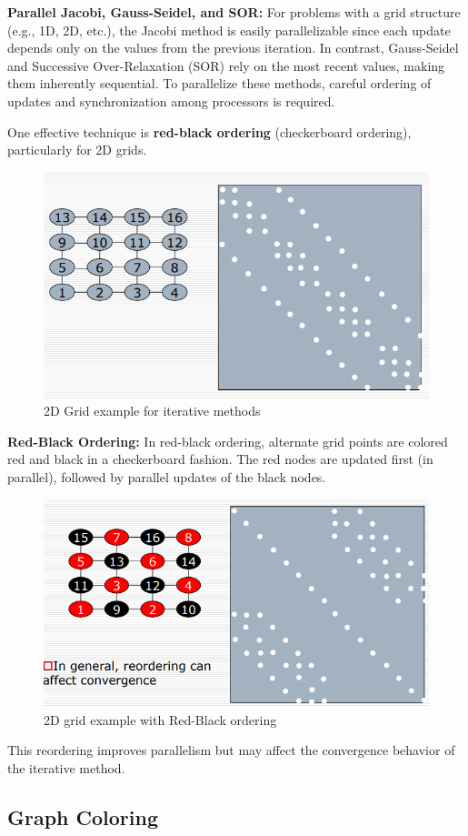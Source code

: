 \documentclass[12pt]{book}
\begin{document}
\textbf{Parallel Jacobi, Gauss-Seidel, and SOR:}  
For problems with a grid structure (e.g., 1D, 2D, etc.), the Jacobi method is easily parallelizable since each update depends only on the values from the previous iteration.  
In contrast, Gauss-Seidel and Successive Over-Relaxation (SOR) rely on the most recent values, making them inherently sequential. To parallelize these methods, careful ordering of updates and synchronization among processors is required.

One effective technique is \textbf{red-black ordering} (checkerboard ordering), particularly for 2D grids.  

\begin{figure}[ht]
    \centering
    \includegraphics[width=0.5\linewidth]{images/2dgridexam.png}
    \caption{2D Grid example for iterative methods}
    \label{fig:2dgridexamp}
\end{figure}

\textbf{Red-Black Ordering:}  
In red-black ordering, alternate grid points are colored red and black in a checkerboard fashion. The red nodes are updated first (in parallel), followed by parallel updates of the black nodes.  

\begin{figure}[ht]
    \centering
    \includegraphics[width=0.5\linewidth]{images/2DRBorder.png}
    \caption{2D grid example with Red-Black ordering}
    \label{fig:2DRBord}
\end{figure}

This reordering improves parallelism but may affect the convergence behavior of the iterative method.


\subsection*{Graph Coloring}
\end{document}
